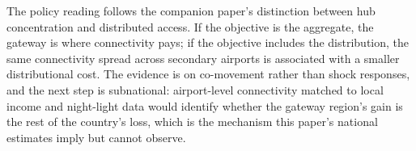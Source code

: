 \documentclass[12pt]{article}
\begin{document}
The policy reading follows the companion paper's distinction between hub concentration and distributed access. If the objective is the aggregate, the gateway is where connectivity pays; if the objective includes the distribution, the same connectivity spread across secondary airports is associated with a smaller distributional cost. The evidence is on co-movement rather than shock responses, and the next step is subnational: airport-level connectivity matched to local income and night-light data would identify whether the gateway region's gain is the rest of the country's loss, which is the mechanism this paper's national estimates imply but cannot observe.



\end{document}

